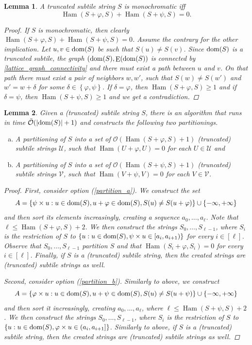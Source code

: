 \documentclass[a4paper,11pt]{article}
\let\Cref\cref
\newtheorem{lemma}{Lemma}[section]
\renewcommand{\O}{\mathcal{O}}
\newcommand{\tO}{\tilde{\mathcal{O}}}
\newcommand{\U}{\mathcal{U}}
\newcommand{\V}{\mathcal{V}}
\renewcommand{\phi}{\varphi}
\newcommand{\set}[1]{\left\lbrace #1 \right\rbrace}
\DeclareMathOperator*{\Edges}{E}
\DeclareMathOperator*{\Ham}{Ham}
\newcommand{\absolute}[1]{\left\lvert#1\right\rvert}
\begin{document}
\begin{lemma}\label{monochromacy_condition}
	A truncated subtile string $S$ is monochromatic iff
	\[\Ham(S + \phi, S) + \Ham(S + \psi, S) = 0.\]
	\begin{proof}
		If $S$ is monochromatic, then clearly $\Ham(S + \phi, S) + \Ham(S + \psi, S) = 0$.
		Assume the contrary for the other implication.
		Let $u, v \in \operatorname*{dom}(S)$ be such that $S(u) \neq S(v)$.
		Since $\operatorname*{dom}(S)$ is a truncated subtile, the graph $(\d{S}, \Edges(\d{S})$ is connected by \Cref{lattice_graph_connectivity} and there must exist a path between $u$ and $v$.
		On that path there must exist a pair of neighbors $w, w'$, such that $S(w) \neq S(w')$ and $w' = w + \delta$ for some $\delta \in \set{\phi, \psi}$.
		If $\delta = \phi$, then $\Ham(S + \phi, S) \ge 1$ and if $\delta = \psi$, then $\Ham(S + \psi, S) \ge 1$ and we get a contradiction.
	\end{proof}
\end{lemma}


\begin{lemma}\label{cut_partitioning}
Given a (truncated) subtile string $S$, there is an algorithm that runs in time $\tO(\absolute{\d{S}} + 1)$ and constructs the following two partitionings.
	\begin{enumerate}[(a)]
		\item A partitioning of $S$ into a set of $\O(\Ham(S + \phi, S) + 1)$ (truncated) subtile strings $\U$, such that $\Ham(U + \phi, U) = 0$ for each $U \in \U$ and \label{partition_a}
		\item A partitioning of $S$ into a set of $\O(\Ham(S + \psi, S) + 1)$ (truncated) subtile strings $\V$, such that $\Ham(V + \psi, V) = 0$ for each $V \in \V$. \label{partition_b}
	\end{enumerate}
	\begin{proof}
		First, consider option (\ref{partition_a}). We construct the set
		\[ A = \set{\s{u} : u \in \d{S}, u + \phi \in \d{S}, S(u) \neq S(u + \phi)} \cup \set{-\infty, +\infty}\]
		and then sort its elements increasingly, creating a sequence $a_0, \dots, a_\ell$.
		Note that $\ell \le \Ham(S + \phi, S) + 2$.
		We then construct the strings $S_0, \dots, S_{\ell - 1}$, where $S_i$ is the restriction of $S$ to
		$\set{u : u \in \d{S}, \s{u} \in [a_i, a_{i + 1})}$ for every $i \in [\ell]$.
		Observe that $S_0, \dots, S_{\ell - 1}$ partition $S$ and that $\Ham(S_i + \phi, S_i) = 0$ for every $i \in [\ell]$. Finally, if $S$ is a (truncated) subtile string, then the created strings are (truncated) subtile strings as well.
	
		Second, consider option (\ref{partition_b}). Similarly to above, we construct
		\[ A = \set{\h{u} : u \in \d{S}, u + \psi \in \d{S}, S(u) \neq S(u + \psi)} \cup \set{-\infty, +\infty} \]
		and then sort it increasingly, creating $a_0, \dots, a_\ell$, where $\ell \le \Ham(S + \psi, S) + 2$.
		We then construct the strings $S_0, \dots, S_{\ell - 1}$, where $S_i$ is the restriction of $S$ to 
		$\set{u : u \in \d{S}, \h{u} \in (a_i, a_{i + 1}]}$. Similarly to above, if $S$ is a (truncated) subtile string, then the created strings are (truncated) subtile strings as well.
	\end{proof}
\end{lemma}
\end{document}
